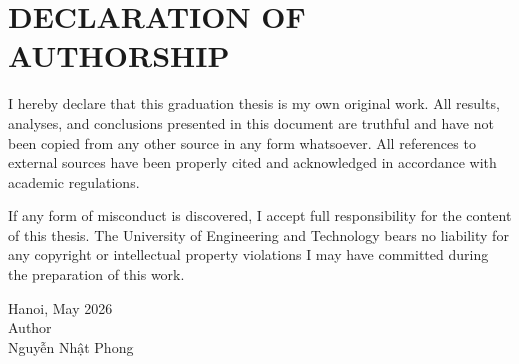 \clearpage
{}
{}
\chapter*{DECLARATION OF AUTHORSHIP}

\vspace{1cm}

I hereby declare that this graduation thesis is my own original work. All results, analyses, and conclusions presented in this document are truthful and have not been copied from any other source in any form whatsoever. All references to external sources have been properly cited and acknowledged in accordance with academic regulations.

If any form of misconduct is discovered, I accept full responsibility for the content of this thesis. The University of Engineering and Technology bears no liability for any copyright or intellectual property violations I may have committed during the preparation of this work.

\vspace{3cm}

\begin{flushright}
Hanoi, May 2026\\[0.5em]
Author\\[2.5cm]
Nguyễn Nhật Phong
\end{flushright}
